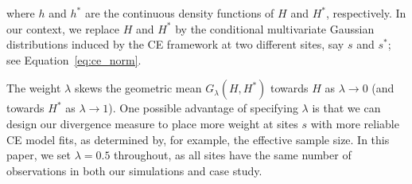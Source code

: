 \documentclass[12pt,compact]{article}
\begin{document}
where $h$ and $h^*$ are the continuous density functions of $H$ and $H^*$, respectively. 
In our context, we replace $H$ and $H^*$ by the conditional multivariate Gaussian distributions induced by the CE framework at two different sites, say $s$ and $s^*$; see Equation~\eqref{eq:ce_norm}.

The weight $\lambda$ skews the geometric mean $G_{\lambda}(H,H^*)$ towards $H$ as $\lambda \to 0$ (and towards $H^*$ as $\lambda \to 1$).
One possible advantage of specifying $\lambda$ is that we can design our divergence measure to place more weight at sites $s$ with more reliable CE model fits, as determined by, for example, the effective sample size.
In this paper, we set $\lambda = 0.5$ throughout, as all sites have the same number of observations in both our simulations and case study.
\end{document}

